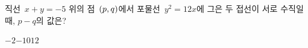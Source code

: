 직선~$x+y=-5$ 위의 점~$(p{,}\mkern3mu\mathopen{}q)$에서 포물선~$y^2=12x$에 그은 두 접선이 서로 수직일 때, $p-q$의 값은?
\begin{choices32}{$-2$}{$-1$}{$0$}{$1$}{$2$}\end{choices32}
